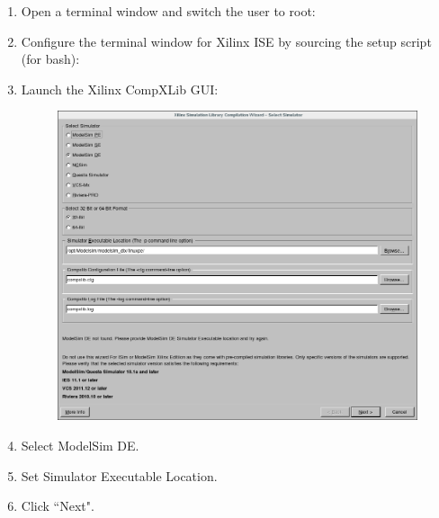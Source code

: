 \begin{flushleft}
	\begin{enumerate}
	 	\item Open a terminal window and switch the user to root:
			\subitem {}
		\item Configure the terminal window for Xilinx ISE by sourcing the setup script (for bash):
			\subitem {}
			\subitem {}
		\item Launch the Xilinx CompXLib GUI:
			\subitem {}
			\subitem {}

	\begin{figure}[H]
	\centering\captionsetup{type=figure}\includegraphics[scale=0.5]{Xilinx_CompXLib_1_Select32bit}
		\label{fig:wizard_page_1}
	\end{figure}

		\item Select ModelSim DE.
		\item Set Simulator Executable Location.
		\item Click ``Next".


\end{enumerate}
\end{flushleft}
